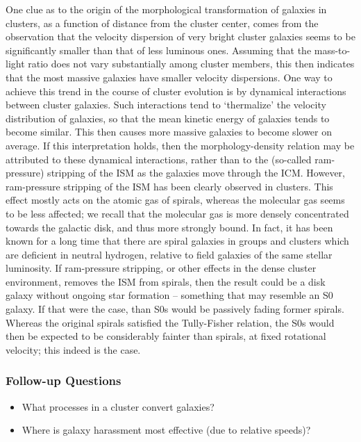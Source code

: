 \documentclass[a4paper,11pt]{article}
\begin{document}
{\noindent}One clue as to the origin of the morphological transformation of galaxies in clusters, as a function of distance from the cluster center, comes from the observation that the velocity dispersion of very bright cluster galaxies seems to be significantly smaller than that of less luminous ones. Assuming that the mass-to-light ratio does not vary substantially among cluster members, this then indicates that the most massive galaxies have smaller velocity dispersions. One way to achieve this trend in the course of cluster evolution is by dynamical interactions between cluster galaxies. Such interactions tend to `thermalize' the velocity distribution of galaxies, so that the mean kinetic energy of galaxies tends to become similar. This then causes more massive galaxies to become slower on average. If this interpretation holds, then the morphology-density relation may be attributed to these dynamical interactions, rather than to the (so-called ram-pressure) stripping of the ISM as the galaxies move through the ICM. However, ram-pressure stripping of the ISM has been clearly observed in clusters. This effect mostly acts on the atomic gas of spirals, whereas the molecular gas seems to be less affected; we recall that the molecular gas is more densely concentrated towards the galactic disk, and thus more strongly bound. In fact, it has been known for a long time that there are spiral galaxies in groups and clusters which are deficient in neutral hydrogen, relative to field galaxies of the same stellar luminosity. If ram-pressure stripping, or other effects in the dense cluster environment, removes the ISM from spirals, then the result could be a disk galaxy without ongoing star formation -- something that may resemble an S0 galaxy. If that were the case, than S0s would be passively fading former spirals. Whereas the original spirals satisfied the Tully-Fisher relation, the S0s would then be expected to be considerably fainter than spirals, at fixed rotational velocity; this indeed is the case.

\subsubsection{Follow-up Questions}

\begin{itemize}
    \item What processes in a cluster convert galaxies?
    \item Where is galaxy harassment most effective (due to relative speeds)?
\end{itemize}
\end{document}
